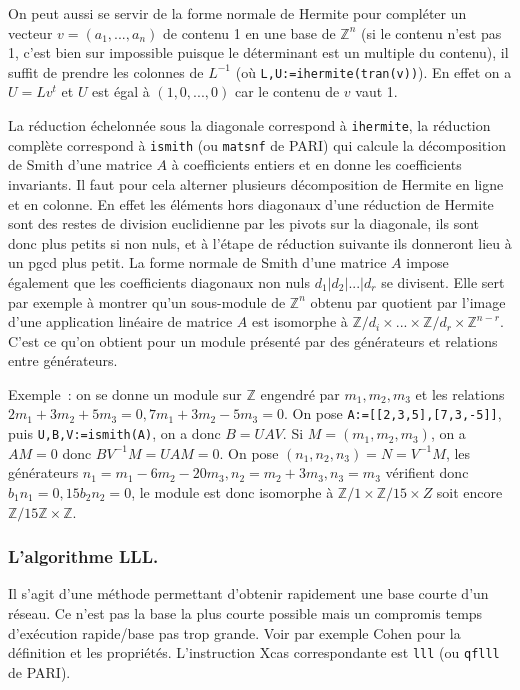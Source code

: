 \documentclass[a4paper,11pt]{article}
\newcommand{\Z}{{\mathbb{Z}}}
\begin{document}
On peut aussi se servir de la forme normale de Hermite pour
compl\'eter un vecteur $v=(a_1,...,a_n)$ de contenu 1 en une base
de $\Z^n$ (si le contenu n'est pas 1, c'est bien sur impossible
puisque le d\'eterminant est un multiple du contenu), il suffit
de prendre les colonnes de $L^{-1}$ 
(o\`u \verb|L,U:=ihermite(tran(v))|).
En effet on a $U=L v^t$ et $U$ est \'egal \`a $(1,0,...,0)$ car le
contenu de $v$ vaut 1.

La r\'eduction \'echelonn\'ee sous la diagonale correspond \`a
\verb|ihermite|, la r\'eduction compl\`ete correspond \`a
\verb|ismith|
(ou \verb|matsnf| de PARI) qui 
calcule la d\'ecomposition de Smith d'une matrice $A$ \`a coefficients
entiers et en donne les coefficients invariants.
Il faut pour cela alterner plusieurs d\'ecomposition de Hermite en
ligne et en colonne. En effet les \'el\'ements hors diagonaux d'une
r\'eduction de Hermite sont des restes de division euclidienne par
les pivots sur la diagonale, ils sont donc plus petits si non nuls, et
\`a l'\'etape de r\'eduction suivante ils donneront lieu \`a un pgcd
plus petit.
La forme normale de Smith d'une matrice $A$ impose \'egalement que les coefficients
diagonaux non nuls $d_1|d_2|...|d_r$ se divisent. Elle sert par exemple \`a montrer
qu'un sous-module de $\Z^n$ obtenu par quotient par l'image 
d'une application lin\'eaire de matrice $A$ est isomorphe 
\`a $\Z/d_i \times ... \times \Z/d_r \times \Z^{n-r}$. C'est ce
qu'on obtient pour un module pr\'esent\'e par des g\'en\'erateurs
et relations entre g\'en\'erateurs.

Exemple~: on se donne un module sur $\Z$ engendr\'e par $m_1,m_2,m_3$
et les relations $2m_1+3m_2+5m_3=0, 7m_1+3m_2-5m_3=0$.
On pose \verb|A:=[[2,3,5],[7,3,-5]]|, puis
\verb|U,B,V:=ismith(A)|, on a donc $B=UAV$.
Si $M=(m_1,m_2,m_3)$, on a $AM=0$ donc $B V^{-1}M=UAM=0$.
On pose $(n_1,n_2,n_3)=N=V^{-1}M$, 
les g\'en\'erateurs $n_1=m_1-6m_2-20m_3, n_2=m_2+3m_3,n_3=m_3$
v\'erifient donc $b_1 n_1=0, 15 b_2n_2=0$, le module est donc
isomorphe \`a  $\Z/1 \times \Z/15 \times Z$ soit encore $\Z/15\Z
\times \Z$.

\subsubsection{L'algorithme LLL.} 
Il s'agit d'une m\'ethode permettant d'obtenir rapidement
une base courte d'un r\'eseau. Ce n'est pas la base la plus courte
possible mais un compromis temps d'ex\'ecution rapide/base
pas trop grande. Voir par exemple Cohen pour la d\'efinition
et les propri\'et\'es. L'instruction Xcas correspondante est
\verb|lll| (ou \verb|qflll| de PARI).
\end{document}
